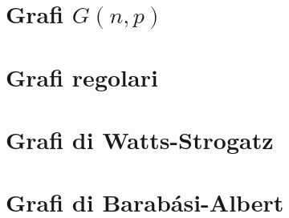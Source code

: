 \section{Grafi $G(n,p)$}

\section{Grafi regolari}

\section{Grafi di Watts-Strogatz}

\section{Grafi di Barabási-Albert}